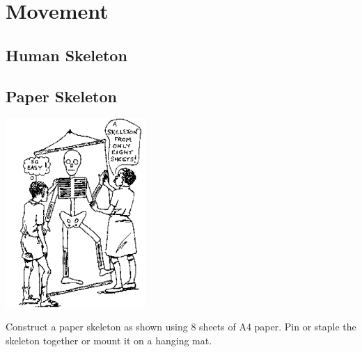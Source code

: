 \section{Movement} 

\begin{multicols}{2}


\section*{Human Skeleton} 


\subsection{Paper Skeleton} %

\begin{center}
\includegraphics[width=0.4\textwidth]{./img/source/skeleton-full.png}
\end{center}
Construct a paper skeleton as shown using 8 sheets of A4 paper. Pin or staple the skeleton together or mount it on a hanging mat.


\end{multicols}
